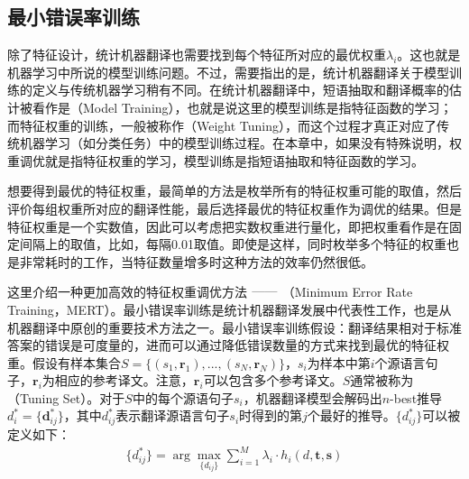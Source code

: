 
\subsection{最小错误率训练}\label{subsection-4.2.6}

\parinterval 除了特征设计，统计机器翻译也需要找到每个特征所对应的最优权重$\lambda_i$。这也就是机器学习中所说的模型训练问题。不过，需要指出的是，统计机器翻译关于模型训练的定义与传统机器学习稍有不同。在统计机器翻译中，短语抽取和翻译概率的估计被看作是{\small{}}（Model Training），也就是说这里的模型训练是指特征函数的学习；而特征权重的训练，一般被称作{\small{}}（Weight Tuning），而这个过程才真正对应了传统机器学习（如分类任务）中的模型训练过程。在本章中，如果没有特殊说明，权重调优就是指特征权重的学习，模型训练是指短语抽取和特征函数的学习。

\parinterval 想要得到最优的特征权重，最简单的方法是枚举所有的特征权重可能的取值，然后评价每组权重所对应的翻译性能，最后选择最优的特征权重作为调优的结果。但是特征权重是一个实数值，因此可以考虑把实数权重进行量化，即把权重看作是在固定间隔上的取值，比如，每隔0.01取值。即使是这样，同时枚举多个特征的权重也是非常耗时的工作，当特征数量增多时这种方法的效率仍然很低。

\parinterval 这里介绍一种更加高效的特征权重调优方法$\ \dash \ ${\small{}}（Minimum Error Rate Training，MERT）。最小错误率训练是统计机器翻译发展中代表性工作，也是从机器翻译中原创的重要技术方法之一\cite{och2003minimum}。最小错误率训练假设：翻译结果相对于标准答案的错误是可度量的，进而可以通过降低错误数量的方式来找到最优的特征权重。假设有样本集合$S = \{(s_1,\mathbf{r}_1),...,(s_N,\mathbf{r}_N)\}$，$s_i$为样本中第$i$个源语言句子，$\mathbf{r}_i$为相应的参考译文。注意，$\mathbf{r}_i$可以包含多个参考译文。$S$通常被称为{\small{}}（Tuning Set）。对于$S$中的每个源语句子$s_i$，机器翻译模型会解码出$n$-best推导$d_{i}^{\ast} = \{\mathbf{d}_{ij}^{\ast}\}$，其中$d_{ij}^{\ast}$表示翻译源语言句子$s_i$时得到的第$j$个最好的推导。$\{d_{ij}^{\ast}\}$可以被定义如下：
\begin{eqnarray}
\{d_{ij}^{\ast}\} = \arg\max_{\{d_{ij}\}} \sum_{i=1}^{M} \lambda_i \cdot h_i (d,\mathbf{t},\mathbf{s})
\label{eq:4-17}
\end{eqnarray}

